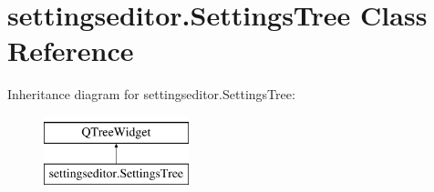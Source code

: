 \hypertarget{classsettingseditor_1_1SettingsTree}{}\section{settingseditor.\+Settings\+Tree Class Reference}
\label{classsettingseditor_1_1SettingsTree}
Inheritance diagram for settingseditor.\+Settings\+Tree\+:\begin{figure}[H]
\begin{center}
\leavevmode
\includegraphics[height=2.000000cm]{classsettingseditor_1_1SettingsTree}
\end{center}
\end{figure}
